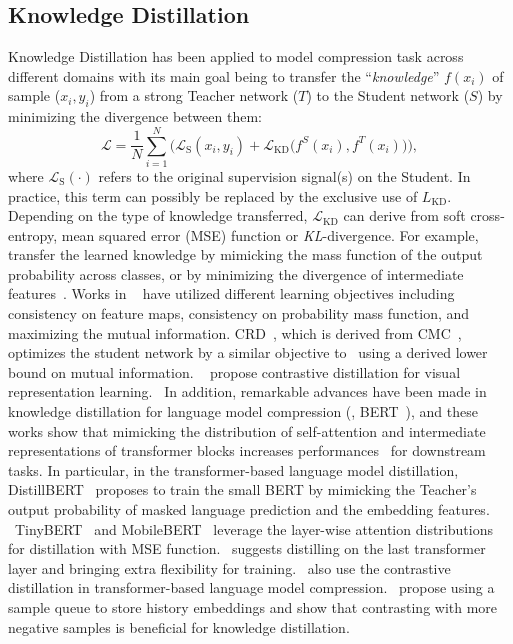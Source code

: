 \subsection{Knowledge Distillation}
Knowledge Distillation has been applied to model compression task across different domains with its main goal being to transfer the ``\textit{knowledge}'' $f(x_i)$ of sample ($x_i, y_i$) from a strong Teacher network ($T$) to the Student network ($S$) by minimizing the divergence between them:
\begin{equation}
\mathcal{L} = \frac{1}{N}\sum_{i=1}^{N}\bigg(\mathcal{L}_\text{S}(x_i, y_i) + \mathcal{L}_\text{KD}\Big(f^S(x_i), f^T(x_i)\Big)\bigg),
\end{equation}
where $\mathcal{L}_\text{S}(\cdot)$ refers to the original supervision signal(s) on the Student. In practice, this term can possibly be replaced by the exclusive use of $L_\text{KD}$. Depending on the type of knowledge transferred, $\mathcal{L}_\text{KD}$ can derive from soft cross-entropy, mean squared error (MSE) function or \textit{KL}-divergence.
For example,~\citep{hinton2015distilling,bucilua2006model} transfer the learned knowledge by mimicking the mass function of the output probability across classes, or by minimizing the divergence of intermediate features~\citep{yim2017gift,koratana2019lit,huang2017like,yalniz2019billion,xie2020self}.
Works in ~\citep{ahn2019variational,yim2017gift,koratana2019lit,huang2017like} have utilized different learning objectives including consistency on feature maps, consistency on probability mass function, and maximizing the mutual information. CRD~\citep{tian2019contrastive}, which is derived from CMC~\citep{tian2019contrastive1}, optimizes the student network by a similar objective to~\citep{oord2018representation} using a derived lower bound on mutual information. 
~\citep{tian2019contrastive,tian2019contrastive,fang2021seed} propose contrastive distillation for visual representation learning.  In addition, remarkable advances have been made in knowledge distillation for language model compression (\ie, BERT~\citep{devlin2018bert}), and these works show that mimicking the distribution of self-attention and intermediate representations of transformer blocks increases performances~\citep{sanh2019distilbert,jiao2019tinybert,sun2020mobilebert,xu2020bert} for downstream tasks.
In particular, in the transformer-based language model distillation, DistillBERT~\citep{sanh2019distilbert} proposes to train the small BERT by mimicking the Teacher's output probability of masked language prediction and the embedding features.  TinyBERT~\citep{jiao2019tinybert} and MobileBERT~\citep{sun2020mobilebert} leverage the layer-wise attention distributions for distillation with MSE function.~\citep{wang2020minilm} suggests distilling on the last transformer layer and bringing extra flexibility for training.~\citep{sun2020contrastive,chen2020wasserstein} also use the contrastive distillation in transformer-based language model compression.~\citep{fang2021seed,sun2020contrastive} propose using a sample queue to store history embeddings and show that contrasting with more negative samples is beneficial for knowledge distillation. 

